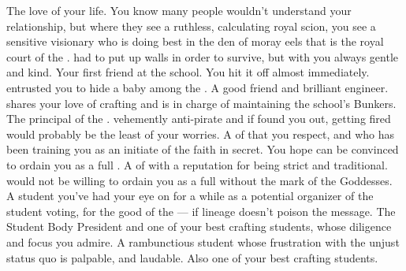 \documentclass[char]{GL2020}
\begin{document}
\begin{contacts}
    \contact{\cPrince{}} The love of your life. You know many people wouldn't understand your relationship, but where they see a ruthless, calculating royal scion, you see a sensitive visionary who is doing \cPrince{\their} best in the den of moray eels that is the royal court of the \pFarm{}. \cPrince{\Theyhave} had to put up walls in order to survive, but with you \cPrince{\theyare} always gentle and kind.
    \contact{\cEthics{}} Your first friend at the school. You hit it off almost immediately. \cEthics{\They} entrusted you to hide a baby among the \pShippies{}.
    \contact{\cBunker{}} A good friend and brilliant engineer. \cBunker{} shares your love of crafting and is in charge of maintaining the school's Bunkers.
    \contact{\cPrincipal{}} The principal of the \pSchool{}. \cPrincipal{\Theyare} vehemently anti-pirate and if \cPrincipal{\they} found you out, getting fired would probably be the least of your worries.
    \contact{\cFlowPriest{}} A \cFlowPriest{\cleric} of \cFlow{} that you respect, and who has been training you as an initiate of the faith in secret. You hope \cFlowPriest{\they} can be convinced to ordain you as a full \cPirate{\cleric}.
    \contact{\cEbbPriest{}} A \cEbbPriest{\cleric} of \cEbb{} with a reputation for being strict and traditional. \cEbbPriest{\They} would not be willing to ordain you as a full \cPirate{\cleric} without the mark of the Goddesses.
    \contact{\cWarlordDaughter{}} A student you've had your eye on for a while as a potential organizer of the student voting, for the good of the \pShip{} — if \cWarlordDaughter{\their} lineage doesn't poison the message.
    \contact{\cPresident{}} The Student Body President and one of your best crafting students, whose diligence and focus you admire.
    \contact{\cPirateChild{}} A rambunctious student whose frustration with the unjust status quo is palpable, and laudable. Also one of your best crafting students.
\end{contacts}
\end{document}
